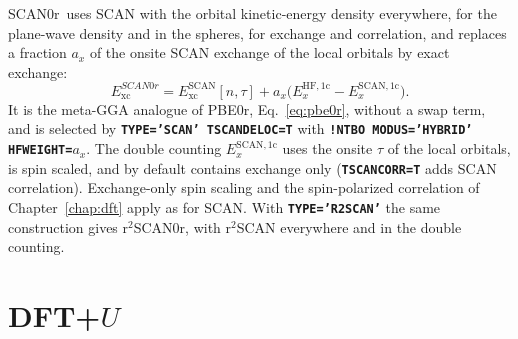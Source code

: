 \documentclass[11pt,a4paper,oneside]{book}
\newcommand{\onec}{\mathrm{1c}}
\newcommand{\pbezero}{PBE0r}
\newcommand{\scanzero}{SCAN0r}
\newcommand{\key}[1]{\textbf{\texttt{#1}}}
\begin{document}
\scanzero\ uses SCAN with the orbital kinetic-energy density everywhere,
for the plane-wave density and in the spheres, for exchange and
correlation, and replaces a fraction $a_x$ of the onsite SCAN exchange of
the local orbitals by exact exchange:
\begin{equation}
  E_{\mathrm{xc}}^{\scanzero} = E_{\mathrm{xc}}^{\mathrm{SCAN}}[n,\tau]
  + a_x\bigl(E_x^{\mathrm{HF},\onec} - E_x^{\mathrm{SCAN},\onec}\bigr).
  \label{eq:scan0r}
\end{equation}
It is the meta-GGA analogue of \pbezero, Eq.~\eqref{eq:pbe0r}, without a
swap term, and is selected by \key{TYPE='SCAN' TSCANDELOC=T} with
\key{!NTBO MODUS='HYBRID' HFWEIGHT=$a_x$}. The double counting
$E_x^{\mathrm{SCAN},\onec}$ uses the onsite $\tau$ of the local orbitals,
is spin scaled, and by default contains exchange only (\key{TSCANCORR=T}
adds SCAN correlation). Exchange-only spin scaling and the
spin-polarized correlation of Chapter~\ref{chap:dft} apply as for SCAN.
With \key{TYPE='R2SCAN'} the same construction gives r$^2$SCAN0r, with
r$^2$SCAN everywhere and in the double counting.

\section{DFT+$U$}\label{sec:dftu}
\end{document}
